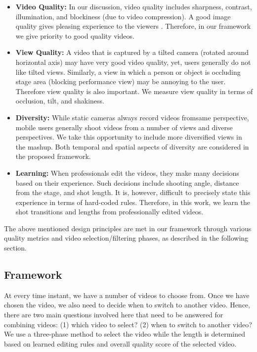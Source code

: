 \documentclass{sig-alternate}
\begin{document}
\begin{itemize}
\item \textbf{Video Quality:} In our discussion, video quality includes
sharpness, contrast, illumination, and blockiness (due to video compression). A good image quality gives pleasing experience to the viewers \cite{10}. Therefore, in our framework we give priority to good quality videos.
\item \textbf{View Quality:} A video that is captured by a tilted camera (rotated around horizontal axis) may have very good video quality, yet, users generally do not like tilted views. Similarly, a view in which a person or object is occluding stage area (blocking performance view) may be annoying to the user. Therefore view quality is also important. We measure view quality in terms of occlusion, tilt, and shakiness.
\item \textbf{Diversity:} While static cameras always record videos fromsame perspective, mobile users generally shoot videos from a number of views and diverse perspectives. We take this opportunity to include more diversified views in the mashup. Both temporal and spatial aspects of diversity are considered in the proposed framework.
\item \textbf{Learning:} When professionals edit the videos, they make
many decisions based on their experience. Such decisions include shooting angle, distance from the stage, and shot length. It is, however, difficult to precisely state this experience in terms of hard-coded rules. Therefore, in this work, we learn the shot transitions and lengths from professionally edited videos.
\end{itemize}

The above mentioned design principles are met in our framework through various quality metrics and video selection/filtering phases, as described in the following section.

\subsection{Framework}
At every time instant, we have a number of videos to choose from. Once we have chosen the video, we also need to decide when to switch to another video. Hence, there are two main questions involved here that need to be answered for combining videos: (1) which video to select? (2) when to switch to another video? We use a three-phase method to select the video while the length is determined based on learned editing rules and overall quality score of the selected video.
\end{document}
